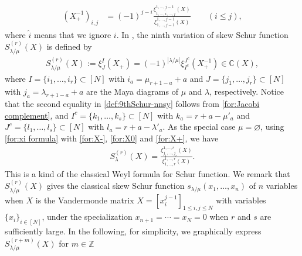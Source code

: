 \documentclass[12pt]{amsart}%
\theoremstyle{definition}
\begin{document}
\begin{align}
\label{for:X+inverse}
 (X^{-1}_{+})_{i,j} 
&=(-1)^{j-i}\frac{\xi^{1,\ldots,j-1}_{1,\ldots,\widehat{i},\ldots,j}(X)}{\xi^{1,\ldots,j-1}_{1,\ldots,j-1}(X)} \qquad  (i\le j),
\end{align}
where $\widehat{i}$ means that we ignore $i$.
In \cite{nnsy}, the ninth variation of skew Schur function
$S^{(r)}_{\lambda/\mu}(X)$ is defined by 
\begin{align}
\label{def:9thSchur-nnsy}
 S^{(r)}_{\lambda/\mu}(X)
:=\xi^{I}_{J}(X_{+})
=(-1)^{|\lambda/\mu|}\xi^{J^c}_{I^c}(X^{-1}_{+})\in \mathbb{C}(X),
\end{align}
where $I=\{i_1,\ldots,i_r\}\subset [N]$ 
with $i_a=\mu_{r+1-a}+a$ 
and $J=\{j_1,\ldots,j_r\}\subset [N]$ 
with $j_a=\lambda_{r+1-a}+a$ 
are the Maya diagrams of $\mu$ and $\lambda$, respectively.
Notice that the second equality in \eqref{def:9thSchur-nnsy} follows from \eqref{for:Jacobi complement},
and $I^{c}=\{k_1,\ldots,k_s\}\subset [N]$ with $k_a=r+a-\mu'_a$
and $J^c=\{l_1,\ldots,l_s\}\subset [N]$ with 
$l_a=r+a-\lambda'_a$.
As the special case $\mu=\varnothing$,
using \eqref{for:xi formula} 
with \eqref{for:X-}, \eqref{for:X0} and \eqref{for:X+}, we have   
\begin{align}
\label{for:Weyl formula}
 S^{(r)}_{\lambda}(X)
=\frac{\xi^{1,\ldots,r}_{j_1,\ldots,j_r}(X)}{\xi^{1,\ldots,r}_{1,\ldots,r}(X)}.
\end{align}
This is a kind of the classical Weyl formula for Schur function.
We remark that 
$S^{(r)}_{\lambda/\mu}(X)$ gives
the classical skew Schur function $s_{\lambda/\mu}(x_1,\ldots,x_n)$ of $n$ variables 
when $X$ is the Vandermonde matrix 
$X=\left[x^{j-1}_{i}\right]_{1\le i,j\le N}$ 
with variables $\{x_i\}_{i\in [N]}$,
under the specialization $x_{n+1}=\cdots=x_{N}=0$ when $r$ and $s$ are sufficiently large.
In the following, for simplicity, we graphically express $S^{(r+m)}_{\lambda/\mu}(X)$ for $m\in\mathbb{Z}$ 
\end{document}
